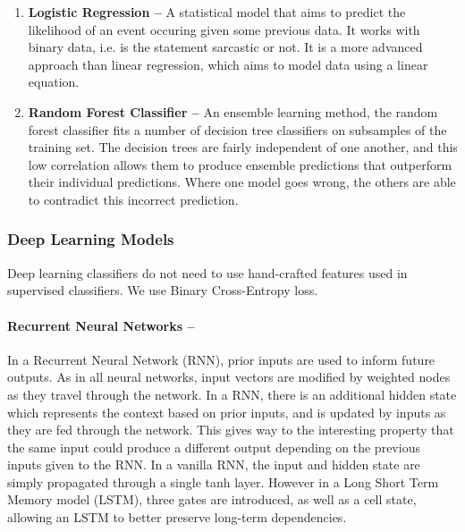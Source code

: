 \documentclass[12pt,a4paper]{article}
\begin{document}
\begin{enumerate}
	\item \textbf{Logistic Regression --} A statistical model that aims to predict the likelihood of an event occuring given some previous data. It works with binary data, i.e. is the statement sarcastic or not. It is a more advanced approach than linear regression, which aims to model data using a linear equation.

	\item \textbf{Random Forest Classifier --}
	An ensemble learning method, the random forest classifier fits a number of decision tree classifiers on subsamples of the training set. The decision trees are fairly independent of one another, and this low correlation allows them to produce ensemble predictions that outperform their individual predictions. Where one model goes wrong, the others are able to contradict this incorrect prediction.
\end{enumerate}


\subsubsection{Deep Learning Models}
Deep learning classifiers do not need to use hand-crafted features used in supervised classifiers. We use Binary Cross-Entropy loss.

\paragraph{Recurrent Neural Networks --}
In a Recurrent Neural Network (RNN), prior inputs are used to inform future outputs. As in all neural networks, input vectors are modified by weighted nodes as they travel through the network. In a RNN, there is an additional hidden state which represents the context based on prior inputs, and is updated by inputs as they are fed through the network. This gives way to the interesting property that the same input could produce a different output depending on the previous inputs given to the RNN. In a vanilla RNN, the input and hidden state are simply propagated through a single tanh layer. However in a Long Short Term Memory model (LSTM), three gates are introduced, as well as a cell state, allowing an LSTM to better preserve long-term dependencies.\\
\end{document}

